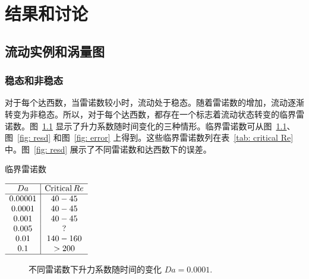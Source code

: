 \chapter{结果和讨论}

\section{流动实例和涡量图}

\subsection{稳态和非稳态}

对于每个达西数，当雷诺数较小时，流动处于稳态。随着雷诺数的增加，流动逐渐转变为非稳态。所以，对于每个达西数，都存在一个标志着流动状态转变的临界雷诺数。图~\ref{fig: Cl_t} 显示了升力系数随时间变化的三种情形。临界雷诺数可从图~\ref{fig: Cl_t}、图~\ref{fig: resd} 和图~\ref{fig: error} 上得到。这些临界雷诺数列在表~\ref{tab: critical Re} 中。图~\ref{fig: resd} 展示了不同雷诺数和达西数下的误差。

\begin{table}
	\centering
	\caption{临界雷诺数}\label{tab: critical Re}
	$\begin{array}{c|c}
	\hline
	Da & \mathrm{Critical}\, Re \\ \hline
	0.00001& 40-45   \\
	0.0001 & 40-45 \\
	0.001  & 40-45 \\
	0.005  & ?   \\
	0.01   & 140-160 \\
	0.1    & >200\\
	\hline
	\end{array}$
\end{table}

\begin{figure}
	\setlength{\subfigcapskip}{-1bp}
	\centering
	\begin{minipage}{\textwidth}
		\centering
	\end{minipage}
	\centering
	\begin{minipage}{\textwidth}
		\centering
	\end{minipage}
	\vspace{0.2em}
	\caption{不同雷诺数下升力系数随时间的变化 $Da=0.0001$.}
	\label{fig: Cl_t}
\end{figure}

